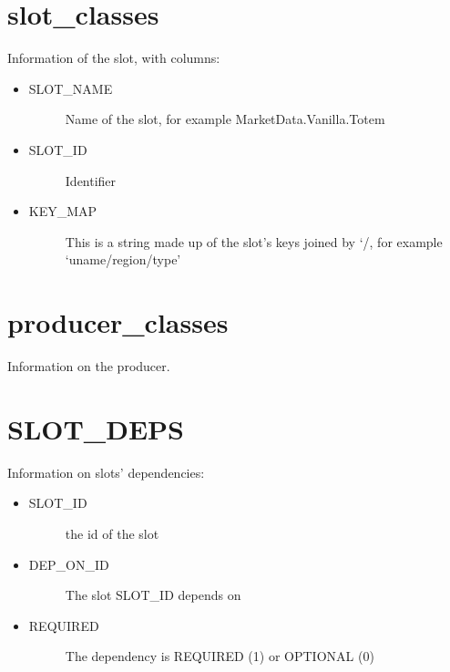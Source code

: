 \documentclass[letterpaper,10pt,english]{sphinxmanual}
\begin{document}
\section{slot\_classes}
\label{\detokenize{mrb:slot-classes}}
Information of the slot, with columns:
\begin{itemize}
\item {} \begin{description}
\item[{SLOT\_NAME}] \leavevmode
Name of the slot, for example MarketData.Vanilla.Totem

\end{description}

\item {} \begin{description}
\item[{SLOT\_ID}] \leavevmode
Identifier

\end{description}

\item {} \begin{description}
\item[{KEY\_MAP}] \leavevmode
This is a string made up of the slot’s keys joined by ‘/, for example ‘uname/region/type’

\end{description}

\end{itemize}


\section{producer\_classes}
\label{\detokenize{mrb:producer-classes}}
Information on the producer.


\section{SLOT\_DEPS}
\label{\detokenize{mrb:slot-deps}}
Information on slots’ dependencies:
\begin{itemize}
\item {} \begin{description}
\item[{SLOT\_ID}] \leavevmode
the id of the slot

\end{description}

\item {} \begin{description}
\item[{DEP\_ON\_ID}] \leavevmode
The slot SLOT\_ID depends on

\end{description}

\item {} \begin{description}
\item[{REQUIRED}] \leavevmode
The dependency is REQUIRED (1) or OPTIONAL (0)

\end{description}

\end{itemize}
\end{document}
